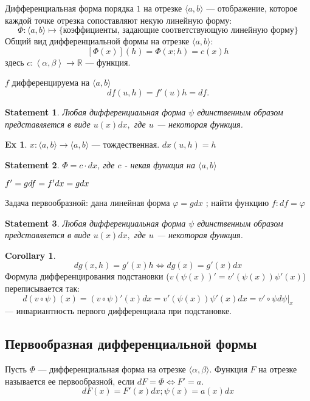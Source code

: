 \documentclass[11pt]{book}
\newcommand{\R}{\mathbb{R}}
\theoremstyle{definition}
\theoremstyle{plain}
\theoremstyle{plain}
\newtheorem*{st}{Statement}
\theoremstyle{definition}
\newtheorem*{ex}{Ex}
\newtheorem*{cor}{Corollary}
\theoremstyle{remark}
\begin{document}
\begin{defn}
Дифференциальная форма порядка $1$ на отрезке $\langle a, b \rangle$ --- отображение, которое каждой точке отрезка сопоставляют некую линейную форму:
$$\Phi :\langle a, b \rangle \mapsto \{\text{коэффициенты, задающие соответствующую линейную форму}\}$$
Общий вид дифференциальной формы на отрезке $\langle a, b \rangle$:
$$[\Phi(x)](h) = \Phi(x; h) = c(x)h$$
здесь $c: \left<\alpha, \beta\right> \to \R$ --- функция.
\end{defn}
\begin{defn}[дифференциал]
    $ f $   дифференцируема на $ \langle a, b \rangle$
    \[
	df(u, h) = f'(u) h = df
    .\]
\end{defn}
\begin{st}
Любая дифференциальная форма $\psi$ единственным образом представляется в виде $u(x)dx,$ где $u$ --- некоторая функция.
\end{st}
\begin{ex}
    $ x: \langle a, b \rangle \to  \langle a, b \rangle$ --- тождественная. $ dx (u, h)= h$
\end{ex}
\begin{st}
    $ \Phi = c \cdot dx$, где  $ c$ - некая функция на $ \langle a, b \rangle$
\end{st}
$ f' = g \\
df = f' dx = g dx$

Задача первообразной: дана линейная форма $ \varphi = g dx$ ; найти функцию $ f: df = \varphi $
\begin{st}
Любая дифференциальная форма $\psi$ единственным образом представляется в виде $u(x)dx,$ где $u$ --- некоторая функция.
\end{st}

\begin{cor}
$$dg(x, h) = g'(x)h \Leftrightarrow dg(x) = g'(x)dx$$
Формула дифференцирования подстановки ($v(\psi(x))' = v'(\psi(x))\psi'(x)$) переписывается так:
$$d(v \circ \psi)(x) = (v \circ \psi)'(x)dx = v'(\psi(x))\psi'(x)dx = \left.v' \circ \psi d\psi\right|_x$$
 --- инвариантность первого дифференциала при подстановке.
\end{cor}
\subsection{Первообразная дифференциальной формы}
\begin{defn}
    Пусть $\Phi$ --- дифференциальная форма на отрезке $\langle\alpha, \beta\rangle$. Функция $F$ на отрезке называется ее первообразной, если $dF = \Phi \Leftrightarrow F' = a$.
$$dF(x) = F'(x)dx; \psi(x) = a(x)dx$$
\end{defn}
\end{document}
